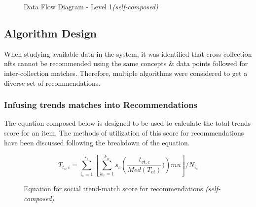 \begin{figure}[h!]
\centering
\setlength{\fboxsep}{10pt}%
\setlength{\fboxrule}{0.5pt}%
\caption{Data Flow Diagram - Level 1\textit{(self-composed)}}
\label{fig:data-flow-diagram-l1}
\end{figure}


\subsection{Algorithm Design}

When studying available data in the system, it was identified that cross-collection \gls{nft}s cannot be recommended using the same concepts \& data points followed for inter-collection matches. Therefore, multiple algorithms were considered to get a diverse set of recommendations.

\subsubsection{Infusing trends matches into Recommendations}
The equation composed below is designed to be used to calculate the total trends score for an item. The methods of utilization of this score for recommendations have been discussed following the breakdown of the equation.

\begin{figure}[h!]
\begin{equation}
T_{t_{s},i} = \sum^{i_{s}}_{i_{s}=1} \left[\sum^{k_{w}}_{k_{w}=1} s_{c} \left(\frac{t_{vt,c}}{Med(T_{vt})})\right) m u \right]/ N_{i_{s}}
\end{equation}
\caption*{Equation for social trend-match score for recommendations \textit{(self-composed)}}
\end{figure}

